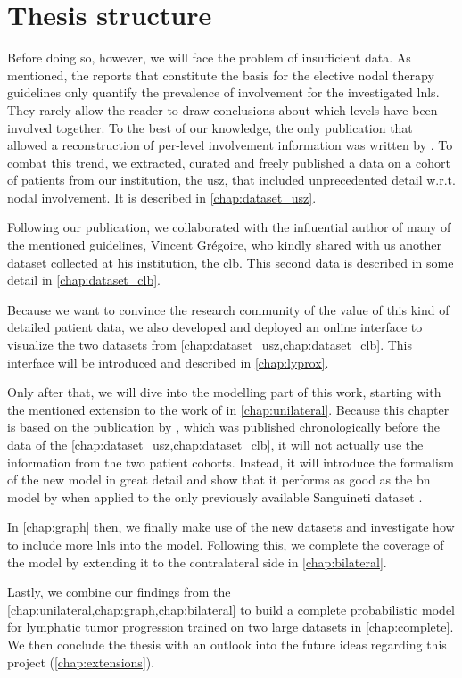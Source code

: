 \documentclass[\relativeRoot/main.tex]{subfiles}
\begin{document}
\section{Thesis structure}
\label{sec:intro:structure}

Before doing so, however, we will face the problem of insufficient data. As mentioned, the reports that constitute the basis for the elective nodal therapy guidelines only quantify the prevalence of involvement for the investigated \glspl{lnl}. They rarely allow the reader to draw conclusions about which levels have been involved together. To the best of our knowledge, the only publication that allowed a reconstruction of per-level involvement information was written by . To combat this trend, we extracted, curated and freely published a data on a cohort of patients from our institution, the \gls{usz}, that included unprecedented detail w.r.t. nodal involvement. It is described in \cref{chap:dataset_usz}.

Following our publication, we collaborated with the influential author of many of the mentioned guidelines, Vincent Grégoire, who kindly shared with us another dataset collected at his institution, the \gls{clb}. This second data is described in some detail in \cref{chap:dataset_clb}.

Because we want to convince the research community of the value of this kind of detailed patient data, we also developed and deployed an online interface to visualize the two datasets from \cref{chap:dataset_usz,chap:dataset_clb}. This interface will be introduced and described in \cref{chap:lyprox}.

Only after that, we will dive into the modelling part of this work, starting with the mentioned extension to the work of  in \cref{chap:unilateral}. Because this chapter is based on the publication by , which was published chronologically before the data of the \cref{chap:dataset_usz,chap:dataset_clb}, it will not actually use the information from the two patient cohorts. Instead, it will introduce the formalism of the new model in great detail and show that it performs as good as the \gls{bn} model by  when applied to the only previously available Sanguineti dataset \cite{sanguineti_defining_2009}.

In \cref{chap:graph} then, we finally make use of the new datasets and investigate how to include more \glspl{lnl} into the model. Following this, we complete the coverage of the model by extending it to the contralateral side in \cref{chap:bilateral}.

Lastly, we combine our findings from the \cref{chap:unilateral,chap:graph,chap:bilateral} to build a complete probabilistic model for lymphatic tumor progression trained on two large datasets in \cref{chap:complete}. We then conclude the thesis with an outlook into the future ideas regarding this project (\cref{chap:extensions}).
\end{document}
